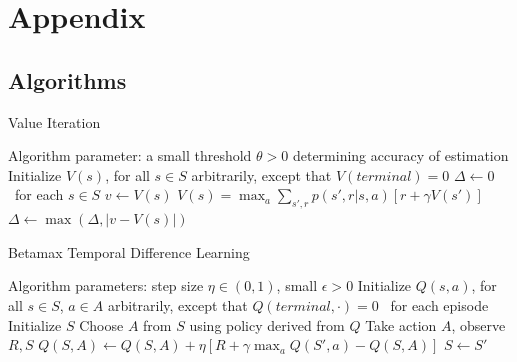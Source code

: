 \documentclass[11pt]{article} %
\begin{document}
\section{Appendix}
\subsection{Algorithms}

\begin{algorithm}
  \caption{Value Iteration}

  \State Algorithm parameter: a small threshold $\theta > 0$ determining accuracy of estimation
  \State Initialize $V(s)$, for all $s \in S$ arbitrarily, except that $V(terminal) = 0$
  \State
  \While{$\Delta > \theta$}
    \State $\Delta \leftarrow 0$
    \Loop \ for each $s \in S$
      \State $v \leftarrow V(s)$
      \State $ V(s) = \max_a \sum_{s',r} p(s',r|s,a) \left[ r + \gamma V(s') \right] $
      \State $\Delta \leftarrow \max(\Delta, |v - V(s)|)$
    \EndLoop
  \EndWhile

\end{algorithm}

\begin{algorithm}
  \caption{Betamax Temporal Difference Learning}

  \State Algorithm parameters: step size $\eta \in (0, 1)$, small $\epsilon > 0$
  \State Initialize $Q(s,a)$, for all $s \in S$, $a \in A$ arbitrarily, except that $Q(terminal,\cdot) = 0$
  \State
  \Loop \ for each episode
    \State Initialize $S$
      \State Choose $A$ from $S$ using policy derived from $Q$
      \State Take action $A$, observe $R, S$
      \State $Q(S, A) \leftarrow Q(S, A) + \eta \left[ R + \gamma \max_a Q(S',a) − Q(S, A) \right] $
      \State $S \leftarrow S'$
    \EndWhile
  \EndLoop

\end{algorithm}
\end{document}
